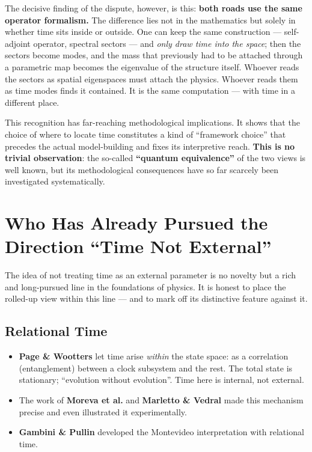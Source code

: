 The decisive finding of the dispute, however, is this: \textbf{both roads use the same operator formalism.} The difference lies not in the mathematics but solely in whether time sits inside or outside. One can keep the same construction --- self-adjoint operator, spectral sectors --- and \emph{only draw time into the space}; then the sectors become modes, and the mass that previously had to be attached through a parametric map becomes the eigenvalue of the structure itself. Whoever reads the sectors as spatial eigenspaces must attach the physics. Whoever reads them as time modes finds it contained. It is the same computation --- with time in a different place.

This recognition has far-reaching methodological implications. It shows that the choice of where to locate time constitutes a kind of ``framework choice'' that precedes the actual model-building and fixes its interpretive reach. \textbf{This is no trivial observation}: the so-called \textbf{``quantum equivalence''} of the two views is well known, but its methodological consequences have so far scarcely been investigated systematically.

\section{Who Has Already Pursued the Direction ``Time Not External''}

The idea of not treating time as an external parameter is no novelty but a rich and long-pursued line in the foundations of physics. It is honest to place the rolled-up view within this line --- and to mark off its distinctive feature against it.

\subsection{Relational Time}
\begin{itemize}[leftmargin=1.4em,itemsep=0.25em]
 \item \textbf{Page \& Wootters} let time arise \emph{within} the state space: as a correlation (entanglement) between a clock subsystem and the rest. The total state is stationary; ``evolution without evolution''. Time here is internal, not external.
 \item The work of \textbf{Moreva et al.} and \textbf{Marletto \& Vedral} made this mechanism precise and even illustrated it experimentally.
 \item \textbf{Gambini \& Pullin} developed the Montevideo interpretation with relational time.
\end{itemize}

